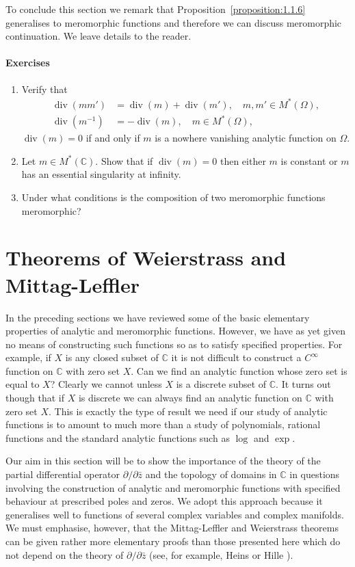 To conclude this section we remark that Proposition~\ref{proposition:1.1.6} generalises to meromorphic functions and therefore we can discuss meromorphic continuation. We leave details to the reader.
\paragraph*{Exercises}
\begin{enumerate}
\item Verify that
\begin{align*}
\operatorname{div}(mm')&=\operatorname{div}(m)+\operatorname{div}(m'),\quad m,m'\in M^*(\Omega),\\
\operatorname{div}(m^{-1})&=-\operatorname{div}(m),\quad m\in M^*(\Omega),
\end{align*}
$\operatorname{div}(m)=0$ if and only if $m$ is a nowhere vanishing analytic function on $\Omega$.
\item Let $m\in M^*(\mathbb C)$. Show that if $\operatorname{div}(m)=0$ then either $m$ is constant or $m$ has an essential singularity at infinity.
\item Under what conditions is the composition of two meromorphic functions meromorphic?
\end{enumerate}

\section{Theorems of Weierstrass and Mittag-Leffler}\label{sec:1:3}
In the preceding sections we have reviewed some of the basic elementary properties of analytic and meromorphic functions. However, we have as yet given no means of constructing such functions so as to satisfy specified properties. For example, if $X$ is any closed subset of $\mathbb C$ it is not difficult to construct a $C^\infty$ function on $\mathbb C$ with zero set $X$. Can we find an analytic function whose zero set is equal to $X$? Clearly we cannot unless $X$ is a discrete subset of $\mathbb C$. It turns out though that if $X$ is discrete we can always find an analytic function on $\mathbb C$ with zero set $X$. This is exactly the type of result we need if our study of analytic functions is to amount to much more than a study of polynomials, rational functions and the standard analytic functions such as $\log$ and $\exp$.

Our aim in this section will be to show the importance of the theory of the partial differential operator $\partial/\partial\bar z$ and the topology of domains in $\mathbb C$ in questions involving the construction of analytic and meromorphic functions with specified behaviour at prescribed poles and zeros. We adopt this approach because it generalises well to functions of several complex variables and complex manifolds. We must emphasise, however, that the Mittag-Leffler and Weierstrass theorems can be given
rather more elementary proofs than those presented here which do not depend on the theory of $\partial/\partial\bar z$ (see, for example, Heins \cite{bib:I:heins-m:1} or Hille \cite{bib:I:hille-e:1}).

